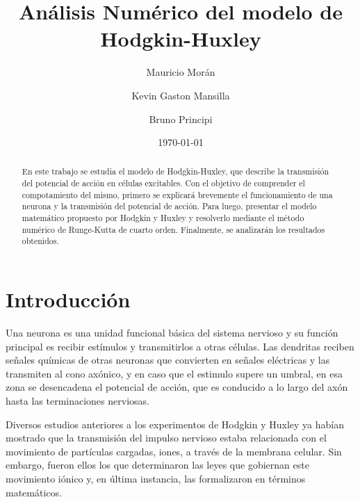 \documentclass[aps,prl,reprint,groupedaddress]{revtex4-2}
\begin{document}
\title{
Análisis Numérico del modelo de Hodgkin-Huxley
}

\author{Mauricio Morán}
\affiliation{}

\author{Kevin Gaston Mansilla}

\author{Bruno Principi}
\affiliation{}

\date{\today}

\begin{abstract}
En este trabajo se estudia el modelo de Hodgkin-Huxley, que describe la
transmisión del potencial de acción en células excitables. Con el objetivo de 
comprender el compotamiento del mismo, primero se explicará brevemente 
el funcionamiento de una neurona y la transmisión del potencial de acción. Para 
luego, presentar el modelo matemático propuesto por Hodgkin y Huxley y resolverlo
mediante el método numérico de Runge-Kutta de cuarto orden. Finalmente, se
analizarán los resultados obtenidos.
\end{abstract}


\maketitle

\section{Introducción}

Una neurona es una unidad funcional básica del sistema nervioso y su función
principal es recibir estímulos y transmitirlos a otras células. Las dendritas 
reciben señales químicas de otras neuronas que convierten en señales eléctricas 
y las transmiten al cono axónico, y en caso que el estimulo supere un umbral, 
en esa zona se desencadena el potencial de acción, que es conducido a lo largo
del axón hasta las terminaciones nerviosas. 

Diversos estudios anteriores a los experimentos de Hodgkin y Huxley ya habían 
mostrado que la transmisión del impulso nervioso estaba relacionada con el 
movimiento de partículas cargadas, iones, a través de la membrana celular. 
Sin embargo, fueron ellos los que determinaron las leyes que gobiernan este 
movimiento iónico y, en última instancia, las formalizaron en 
términos matemáticos. 
\end{document}
